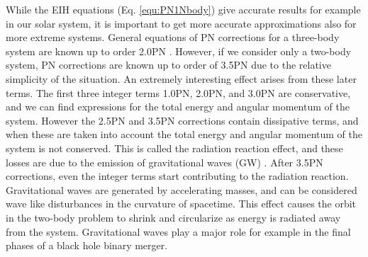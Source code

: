 \documentclass[english, oneside]{HYgradu}
\begin{document}
While the EIH equations (Eq. \eqref{equ:PN1Nbody}) give accurate results for example in our solar system, it is important to get more accurate approximations also for more extreme systems. General equations of PN corrections for a three-body system are known up to order 2.0PN \citep{gravity}. However, if we consider only a two-body system, PN corrections are known up to order of 3.5PN due to the relative simplicity of the situation. An extremely interesting effect arises from these later terms. The first three integer terms 1.0PN, 2.0PN, and 3.0PN are conservative, and we can find expressions for the total energy and angular momentum of the system. However the 2.5PN and 3.5PN corrections contain dissipative terms, and when these are taken into account the total energy and angular momentum of the system is not conserved. This is called the radiation reaction effect, and these losses are due to the emission of gravitational waves (GW) \citep{gravwaves}. After 3.5PN corrections, even the integer terms start contributing to the radiation reaction. Gravitational waves are generated by accelerating masses, and can be considered wave like disturbances in the curvature of spacetime. This effect causes the orbit in the two-body problem to shrink and circularize as energy is radiated away from the system. Gravitational waves play a major role for example in the final phases of a black hole binary merger.
\end{document}
